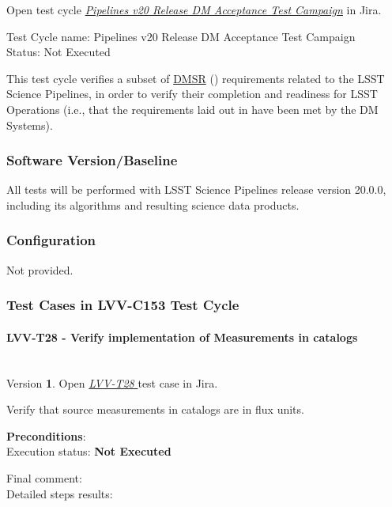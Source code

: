 \documentclass[DM,lsstdraft,STR,toc]{lsstdoc}
\begin{document}
Open test cycle {\it \href{https://jira.lsstcorp.org/secure/Tests.jspa#/testrun/LVV-C153}{Pipelines v20 Release DM Acceptance Test Campaign}} in Jira.

Test Cycle name: Pipelines v20 Release DM Acceptance Test Campaign\\
Status: Not Executed

This test cycle verifies a subset of
\href{https://lse-61.lsst.io/}{DMSR} () requirements related to
the LSST Science Pipelines, in order to verify their completion and
readiness for LSST Operations (i.e., that the requirements laid out in
 have been met by the DM Systems).

\subsubsection{Software Version/Baseline}
All tests will be performed with LSST Science Pipelines release version
20.0.0, including its algorithms and resulting science data products.

\subsubsection{Configuration}
Not provided.

\subsubsection{Test Cases in LVV-C153 Test Cycle}

\paragraph{ LVV-T28 - Verify implementation of Measurements in catalogs }\mbox{}\\

Version \textbf{1}.
Open  \href{https://jira.lsstcorp.org/secure/Tests.jspa#/testCase/LVV-T28}{\textit{ LVV-T28 } }
test case in Jira.

Verify that source measurements in catalogs are in flux units.

\textbf{ Preconditions}:\\


Execution status: {\bf Not Executed }

Final comment:\\


Detailed steps results:
\end{document}
